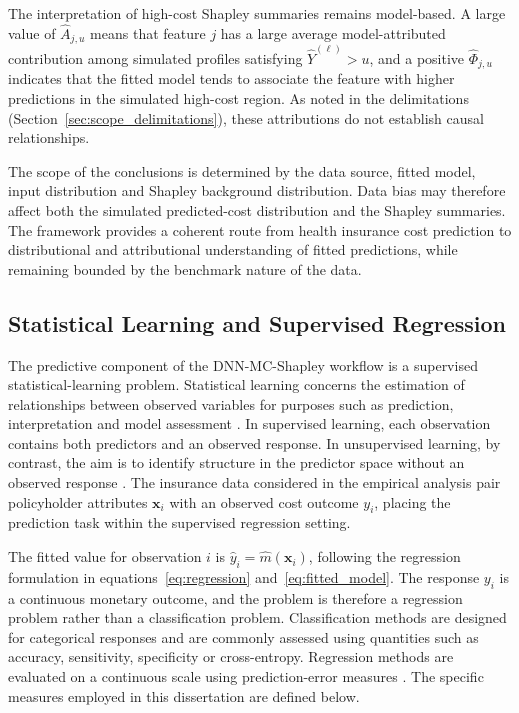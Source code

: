   \noindent
  The interpretation of high-cost Shapley summaries remains model-based. A large
  value of \(\widehat{A}_{j,u}\) means that feature \(j\) has a large average
  model-attributed contribution among simulated profiles satisfying
  \(\widehat{Y}^{(\ell)}>u\), and a positive \(\widehat{\Phi}_{j,u}\) indicates
  that the fitted model tends to associate the feature with higher predictions in
  the simulated high-cost region.  As noted in the delimitations
  (Section~\ref{sec:scope_delimitations}), these attributions do not establish
  causal relationships.

  \noindent
  The scope of the conclusions is determined by the data source, fitted model,
  input distribution and Shapley background distribution. Data bias may therefore affect both the simulated
  predicted-cost distribution and the Shapley summaries. The framework provides a
  coherent route from health insurance cost prediction to distributional and
  attributional understanding of fitted predictions, while remaining bounded by
  the benchmark nature of the data.


\subsection{Statistical Learning and Supervised Regression}
\label{sec:statistical_learning_supervised_regression}

  \noindent
  The predictive component of the DNN-MC-Shapley workflow is a
  supervised statistical-learning problem. Statistical learning concerns the
  estimation of relationships between observed variables for purposes such as
  prediction, interpretation and model assessment
  \citep{james2021introduction, hastie2009elements, vapnik1998statistical}. In supervised learning, each
  observation contains both predictors and an observed response. In unsupervised
  learning, by contrast, the aim is to identify structure in the predictor space
  without an observed response \citep{james2021introduction}. The insurance data
  considered in the empirical analysis pair policyholder attributes
  \(\mathbf{x}_i\) with an observed cost outcome \(y_i\), placing the prediction
  task within the supervised regression setting.

  \noindent
  The fitted value
  for observation \(i\) is \(\widehat{y}_i = \widehat{m}(\mathbf{x}_i)\),
  following the regression formulation in
  equations~\eqref{eq:regression} and~\eqref{eq:fitted_model}. The
  response \(y_i\) is a continuous monetary outcome, and the problem is therefore
  a regression problem rather than a classification problem. Classification
  methods are designed for categorical responses and are commonly assessed using
  quantities such as accuracy, sensitivity, specificity or cross-entropy.
Regression methods are evaluated on a continuous scale using prediction-error measures \citep{james2021introduction,hastie2009elements}. The specific measures employed in this dissertation are defined below.

